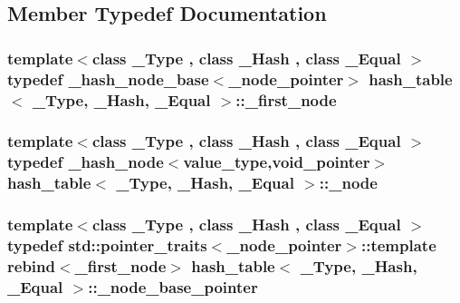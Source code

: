 \subsection{Member Typedef Documentation}
\hypertarget{classhash__table_ae649e68085e4cd585c9dd7e72360a9f4}{}
\subsubsection[{\+\_\+first\+\_\+node}]{\setlength{\rightskip}{0pt plus 5cm}template$<$class \+\_\+\+Type , class \+\_\+\+Hash , class \+\_\+\+Equal $>$ typedef {\bf \+\_\+hash\+\_\+node\+\_\+base}$<${\bf \+\_\+node\+\_\+pointer}$>$ {\bf hash\+\_\+table}$<$ \+\_\+\+Type, \+\_\+\+Hash, \+\_\+\+Equal $>$\+::{\bf \+\_\+first\+\_\+node}}\label{classhash__table_ae649e68085e4cd585c9dd7e72360a9f4}
\hypertarget{classhash__table_a0fec4f0d7cfac374e75932db352b7697}{}
\subsubsection[{\+\_\+node}]{\setlength{\rightskip}{0pt plus 5cm}template$<$class \+\_\+\+Type , class \+\_\+\+Hash , class \+\_\+\+Equal $>$ typedef {\bf \+\_\+hash\+\_\+node}$<${\bf value\+\_\+type},{\bf void\+\_\+pointer}$>$ {\bf hash\+\_\+table}$<$ \+\_\+\+Type, \+\_\+\+Hash, \+\_\+\+Equal $>$\+::{\bf \+\_\+node}}\label{classhash__table_a0fec4f0d7cfac374e75932db352b7697}
\hypertarget{classhash__table_a424f6f949f9f5edb496d1d2571633ea1}{}
\subsubsection[{\+\_\+node\+\_\+base\+\_\+pointer}]{\setlength{\rightskip}{0pt plus 5cm}template$<$class \+\_\+\+Type , class \+\_\+\+Hash , class \+\_\+\+Equal $>$ typedef std\+::pointer\+\_\+traits$<${\bf \+\_\+node\+\_\+pointer}$>$\+::template rebind$<${\bf \+\_\+first\+\_\+node}$>$ {\bf hash\+\_\+table}$<$ \+\_\+\+Type, \+\_\+\+Hash, \+\_\+\+Equal $>$\+::{\bf \+\_\+node\+\_\+base\+\_\+pointer}}\label{classhash__table_a424f6f949f9f5edb496d1d2571633ea1}
\hypertarget{classhash__table_a94de4cb648de7c459348be7df2c9ebd3}{}
